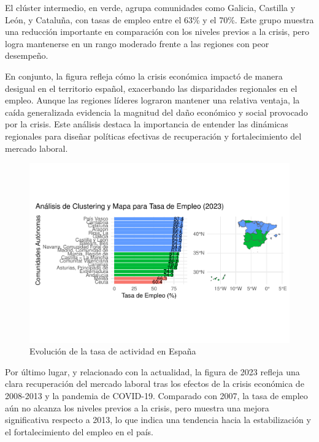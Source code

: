 \documentclass[Universitat de
València,article,submit,moreauthors,pdftex]{Definitions/mdpi}
\begin{document}
El clúster intermedio, en verde, agrupa comunidades como Galicia,
Castilla y León, y Cataluña, con tasas de empleo entre el 63\% y el
70\%. Este grupo muestra una reducción importante en comparación con los
niveles previos a la crisis, pero logra mantenerse en un rango moderado
frente a las regiones con peor desempeño.

En conjunto, la figura refleja cómo la crisis económica impactó de
manera desigual en el territorio español, exacerbando las disparidades
regionales en el empleo. Aunque las regiones líderes lograron mantener
una relativa ventaja, la caída generalizada evidencia la magnitud del
daño económico y social provocado por la crisis. Este análisis destaca
la importancia de entender las dinámicas regionales para diseñar
políticas efectivas de recuperación y fortalecimiento del mercado
laboral.

\begin{figure}[h]

{\centering \includegraphics[width=1\linewidth]{ProyectoAED2024_files/figure-latex/unnamed-chunk-37-1} 

}

\caption{Evolución de la tasa de actividad en España}\label{fig:unnamed-chunk-37}
\end{figure}

Por último lugar, y relacionado con la actualidad, la figura de 2023
refleja una clara recuperación del mercado laboral tras los efectos de
la crisis económica de 2008-2013 y la pandemia de COVID-19. Comparado
con 2007, la tasa de empleo aún no alcanza los niveles previos a la
crisis, pero muestra una mejora significativa respecto a 2013, lo que
indica una tendencia hacia la estabilización y el fortalecimiento del
empleo en el país.
\end{document}
